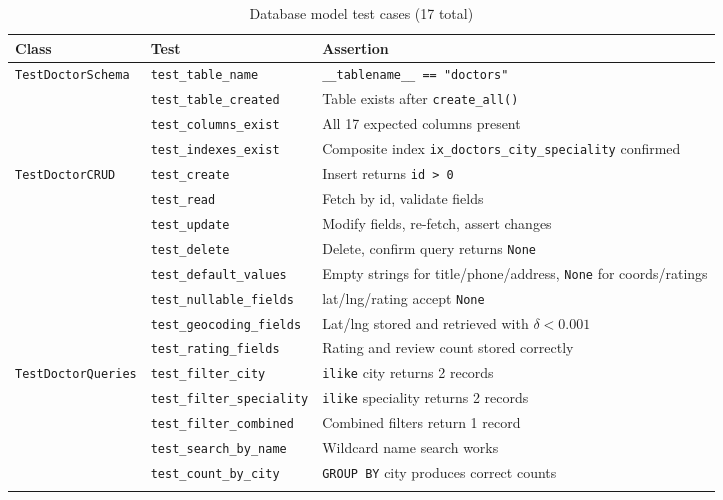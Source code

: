 \documentclass[12pt, a4paper]{article}
\begin{document}
\begin{longtable}{p{3.3cm} p{3.5cm} p{6.5cm}}
  \toprule
  \textbf{Class} & \textbf{Test} & \textbf{Assertion} \\
  \midrule
  \multirow{4}{*}{\texttt{TestDoctorSchema}}
    & \texttt{test\_table\_name}       & \texttt{\_\_tablename\_\_ == "doctors"} \\
    & \texttt{test\_table\_created}    & Table exists after \texttt{create\_all()} \\
    & \texttt{test\_columns\_exist}    & All 17 expected columns present \\
    & \texttt{test\_indexes\_exist}    & Composite index \texttt{ix\_doctors\_city\_speciality} confirmed \\
  \midrule
  \multirow{8}{*}{\texttt{TestDoctorCRUD}}
    & \texttt{test\_create}            & Insert returns \texttt{id > 0} \\
    & \texttt{test\_read}              & Fetch by id, validate fields \\
    & \texttt{test\_update}            & Modify fields, re-fetch, assert changes \\
    & \texttt{test\_delete}            & Delete, confirm query returns \texttt{None} \\
    & \texttt{test\_default\_values}   & Empty strings for title/phone/address, \texttt{None} for coords/ratings \\
    & \texttt{test\_nullable\_fields}  & lat/lng/rating accept \texttt{None} \\
    & \texttt{test\_geocoding\_fields} & Lat/lng stored and retrieved with $\delta < 0.001$ \\
    & \texttt{test\_rating\_fields}    & Rating and review count stored correctly \\
  \midrule
  \multirow{5}{*}{\texttt{TestDoctorQueries}}
    & \texttt{test\_filter\_city}       & \texttt{ilike} city returns 2 records \\
    & \texttt{test\_filter\_speciality} & \texttt{ilike} speciality returns 2 records \\
    & \texttt{test\_filter\_combined}   & Combined filters return 1 record \\
    & \texttt{test\_search\_by\_name}   & Wildcard name search works \\
    & \texttt{test\_count\_by\_city}    & \texttt{GROUP BY} city produces correct counts \\
  \bottomrule
  \caption{Database model test cases (17 total)}
  \label{tab:model_tests}
\end{longtable}
\end{document}
